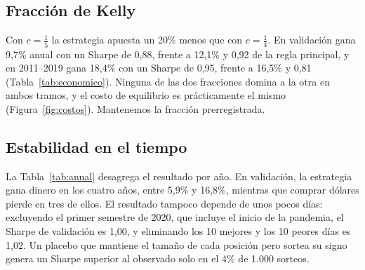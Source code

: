 \documentclass[11pt,a4paper]{article}
\begin{document}
\subsection{Fracción de Kelly}
Con \(c=\tfrac15\) la estrategia apuesta un 20\% menos que con \(c=\tfrac14\). En validación gana 9,7\% anual con un Sharpe de 0,88, frente a 12,1\% y 0,92 de la regla principal, y en 2011--2019 gana 18,4\% con un Sharpe de 0,95, frente a 16,5\% y 0,81 (Tabla~\ref{tab:economico}). Ninguna de las dos fracciones domina a la otra en ambos tramos, y el costo de equilibrio es prácticamente el mismo (Figura~\ref{fig:costos}). Mantenemos la fracción prerregistrada.

\subsection{Estabilidad en el tiempo}\label{sec:estabilidad}
La Tabla~\ref{tab:anual} desagrega el resultado por año. En validación, la estrategia gana dinero en los cuatro años, entre 5,9\% y 16,8\%, mientras que comprar dólares pierde en tres de ellos. El resultado tampoco depende de unos pocos días: excluyendo el primer semestre de 2020, que incluye el inicio de la pandemia, el Sharpe de validación es 1,00, y eliminando los 10 mejores y los 10 peores días es 1,02. Un placebo que mantiene el tamaño de cada posición pero sortea su signo genera un Sharpe superior al observado solo en el 4\% de 1.000 sorteos.
\end{document}
